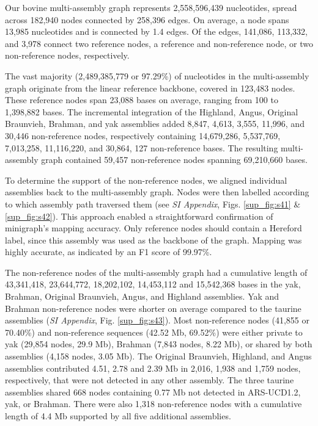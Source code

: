 \documentclass[../main.tex]{subfiles}
\begin{document}
Our bovine multi-assembly graph represents 2,558,596,439 nucleotides, spread across 182,940 nodes connected by 258,396 edges. On average, a node spans 13,985 nucleotides and is connected by 1.4 edges. Of the edges, 141,086, 113,332, and 3,978 connect two reference nodes, a reference and non-reference node, or two non-reference nodes, respectively. 

The vast majority (2,489,385,779 or 97.29\%) of nucleotides in the multi-assembly graph originate from the linear reference backbone, covered in 123,483 nodes. These reference nodes span 23,088 bases on average, ranging from 100 to 1,398,882 bases. The incremental integration of the Highland, Angus, Original Braunvieh, Brahman, and yak assemblies added 8,847, 4,613, 3,555, 11,996, and 30,446 non-reference nodes, respectively containing 14,679,286, 5,537,769, 7,013,258, 11,116,220, and 30,864,
127 non-reference bases. The resulting multi-assembly graph contained 59,457 non-reference nodes spanning 69,210,660 bases. 

To determine the support of the non-reference nodes, we aligned individual assemblies back to the multi-assembly graph. Nodes were then labelled according to which assembly path traversed them (see \emph{SI Appendix}, Figs. \ref{sup_fig:s41} \& \ref{sup_fig:s42}). This approach enabled a straightforward confirmation of minigraph’s mapping accuracy. Only reference nodes should contain a Hereford label, since this assembly was used as the backbone of the graph. Mapping was highly accurate, as indicated by an F1 score of 99.97\%.

The non-reference nodes of the multi-assembly graph had a cumulative length of 43,341,418, 23,644,772, 18,202,102, 14,453,112 and 15,542,368 bases in the yak, Brahman, Original Braunvieh, Angus, and Highland assemblies. Yak and Brahman non-reference nodes were shorter on average compared to the taurine assemblies (\emph{SI Appendix}, Fig. \ref{sup_fig:s43}). Most non-reference nodes (41,855 or 70.40\%) and non-reference sequences (42.52 Mb, 69.52\%) were either private to yak (29,854 nodes, 29.9 Mb), Brahman (7,843 nodes, 8.22 Mb), or shared by both assemblies (4,158 nodes, 3.05 Mb). The Original Braunvieh, Highland, and Angus assemblies contributed 4.51, 2.78 and 2.39 Mb in 2,016, 1,938 and 1,759 nodes, respectively, that were not detected in any other assembly. The three taurine assemblies shared 668 nodes containing 0.77 Mb not detected in ARS-UCD1.2, yak, or Brahman. There were also 1,318 non-reference nodes with a cumulative length of 4.4 Mb supported by all five additional assemblies.
\end{document}
